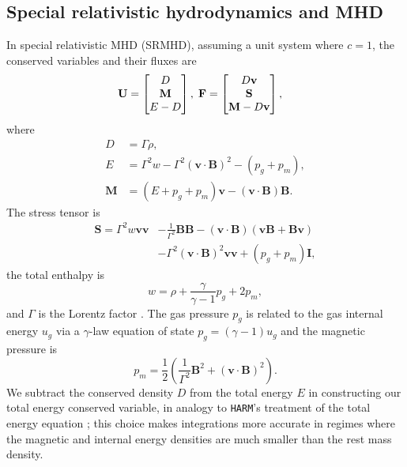 \documentclass[twocolumn, floatfix]{aastex63}
\begin{document}
\subsection{Special relativistic hydrodynamics and MHD}

In special relativistic MHD (SRMHD), assuming a unit system where $c = 1$, the conserved variables and their fluxes are
\begin{align}
{\bf U} &= \begin{bmatrix}
           D \\
           \mathbf{M} \\
           E - D 
         \end{bmatrix},
\hspace*{0.1cm}{\bf F} = \begin{bmatrix}
           D {\bf v} \\
           \mathbf{S} \\
           \mathbf{M} - D \mathbf{v}
         \end{bmatrix},
\label{eq:srmhd_vars}
\end{align}
where 
\begin{align}
D &= \Gamma \rho, \\
E &= \Gamma^2 w - \Gamma^2 \left(\mathbf{v \cdot B} \right)^2 - \left( p_g + p_m \right), \\
\mathbf{M} &= (E + p_g + p_m) \mathbf{v} - \left( \mathbf{v} \cdot \mathbf{B} \right) \mathbf{B}.
\end{align}
The stress tensor is
\begin{align}
\nonumber
    \mathbf{S} = \Gamma^2 w \mathbf{v} \mathbf{v} &- \frac{1}{\Gamma^2} \mathbf{B} \mathbf{B} - \left(\mathbf{v} \cdot \mathbf{B} \right) \left(\mathbf{v} \mathbf{B} + \mathbf{B} \mathbf{v} \right) 
    \\ 
    &- \Gamma^2 \left(\mathbf{v} \cdot \mathbf{B} \right)^2 \mathbf{v} \mathbf{v} + \left(p_g + p_m \right) \mathbf{I},
\end{align}
the total enthalpy is 
\begin{equation}
    w = \rho + \frac{\gamma}{\gamma - 1} p_g + 2 p_m,
\label{eq:rel_enthalpy}
\end{equation}
and $\Gamma$ is the Lorentz factor \citep{WhiteStone2016,Stone2020ApJS..249....4S}.
The gas pressure $p_g$ is related to the gas internal energy $u_g$ via a $\gamma$-law equation of state $p_g = (\gamma - 1) u_g$ and the magnetic pressure is
\begin{equation}
    p_m = \frac{1}{2} \left( \frac{1}{\Gamma^2} \mathbf{B}^2 + \left( \mathbf{v} \cdot \mathbf{B} \right)^2 \right).
\end{equation}
We subtract the conserved density $D$ from the total energy $E$ in constructing our total energy conserved variable, in analogy to \texttt{HARM}'s treatment of the total energy equation \citep{2003ApJ...589..444G}; this choice makes integrations more accurate in regimes where the magnetic and internal energy densities are much smaller than the rest mass density.  
\end{document}
